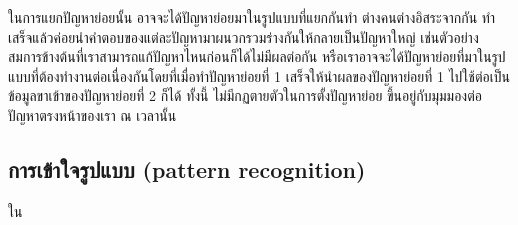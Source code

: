 ในการแยกปัญหาย่อยนั้น อาจจะได้ปัญหาย่อยมาในรูปแบบที่แยกกันทำ ต่างคนต่างอิสระจากกัน ทำเสร็จแล้วค่อยนำคำตอบของแต่ละปัญหามาผนวกรวมร่างกันให้กลายเป็นปัญหาใหญ่ เช่นตัวอย่างสมการข้างต้นที่เราสามารถแก้ปัญหาไหนก่อนก็ได้ไม่มีผลต่อกัน หรือเราอาจจะได้ปัญหาย่อยที่มาในรูปแบบที่ต้องทำงานต่อเนื่องกันโดยที่เมื่อทำปัญหาย่อยที่ 1 เสร็จให้นำผลของปัญหาย่อยที่ 1 ไปใช้ต่อเป็นข้อมูลขาเข้าของปัญหาย่อยที่ 2 ก็ได้ ทั้งนี้ ไม่มีกฏตายตัวในการตั้งปัญหาย่อย ขึ้นอยู่กับมุมมองต่อปัญหาตรงหน้าของเรา ณ เวลานั้น

\subsection{การเข้าใจรูปแบบ (pattern recognition)}
ใน





